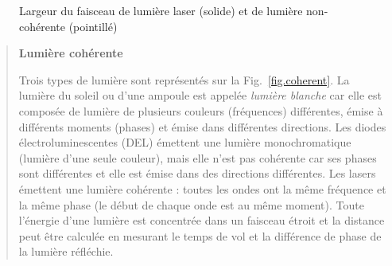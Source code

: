 \begin{figure}
\begin{center}
\end{center}
\caption{Largeur du faisceau de lumière laser (solide) et de lumière non-cohérente (pointillé)}\label{fig.beam}
\end{figure}

\begin{quote}
\begin{center}
\textbf{Lumière cohérente}
\end{center}
Trois types de lumière sont représentés sur la Fig.~\ref{fig.coherent}. La lumière du soleil ou d'une ampoule est appelée \emph{lumière blanche} car elle est composée de lumière de plusieurs couleurs (fréquences) différentes, émise à différents moments (phases) et émise dans différentes directions. Les diodes électroluminescentes (DEL) émettent une lumière monochromatique (lumière d'une seule couleur), mais elle n'est pas cohérente car ses phases sont différentes et elle est émise dans des directions différentes. Les lasers émettent une lumière cohérente : toutes les ondes ont la même fréquence et la même phase (le début de chaque onde est au même moment). Toute l'énergie d'une lumière est concentrée dans un faisceau étroit et la distance peut être calculée en mesurant le temps de vol et la différence de phase de la lumière réfléchie.
\end{quote}

